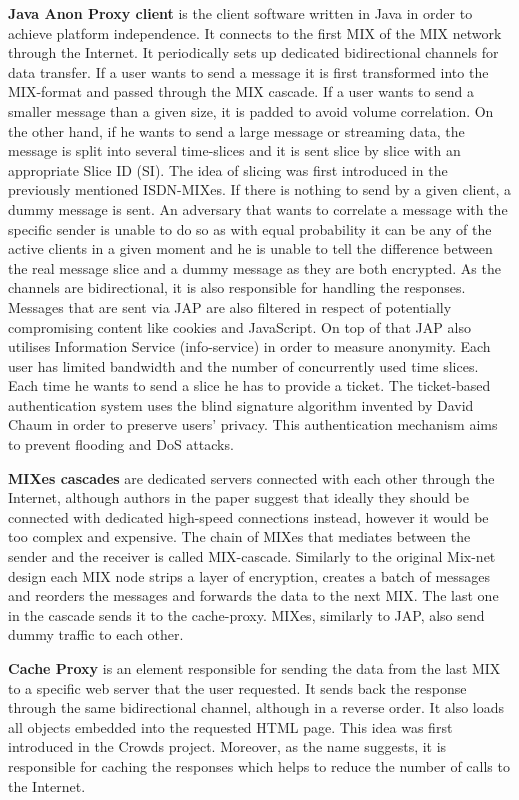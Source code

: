 \textbf{Java Anon Proxy client} is the client software written in Java in order to achieve platform independence. It connects to the first MIX of the MIX network through the Internet. It periodically sets up dedicated bidirectional channels for data transfer. If a user wants to send a message it is first transformed into the MIX-format and passed through the MIX cascade. If a user wants to send a smaller message than a given size, it is padded to avoid volume correlation. On the other hand, if he wants to send a large message or streaming data, the message is split into several time-slices and it is sent slice by slice with an appropriate Slice ID (SI). The idea of slicing was first introduced in the previously mentioned ISDN-MIXes. If there is nothing to send by a given client, a dummy message is sent. An adversary that wants to correlate a message with the specific sender is unable to do so as with equal probability it can be any of the active clients in a given moment and he is unable to tell the difference between the real message slice and a dummy message as they are both encrypted. As the channels are bidirectional, it is also responsible for handling the responses. Messages that are sent via JAP are also filtered in respect of potentially compromising content like cookies and JavaScript. On top of that JAP also utilises Information Service (info-service) in order to measure anonymity. Each user has limited bandwidth and the number of concurrently used time slices. Each time he wants to send a slice he has to provide a ticket. The ticket-based authentication system uses the blind signature algorithm invented by David Chaum \cite{blind-signatures} in order to preserve users' privacy. This authentication mechanism aims to prevent flooding and DoS attacks.

\textbf{MIXes cascades} are dedicated servers connected with each other through the Internet, although authors in the paper suggest that ideally they should be connected with dedicated high-speed connections instead, however it would be too complex and expensive. The chain of MIXes that mediates between the sender and the receiver is called MIX-cascade. Similarly to the original Mix-net design each MIX node strips a layer of encryption, creates a batch of messages and reorders the messages and forwards the data to the next MIX. The last one in the cascade sends it to the cache-proxy. MIXes, similarly to JAP, also send dummy traffic to each other.

\textbf{Cache Proxy} is an element responsible for sending the data from the last MIX to a specific web server that the user requested. It sends back the response through the same bidirectional channel, although in a reverse order. It also loads all objects embedded into the requested HTML page. This idea was first introduced in the Crowds project. Moreover, as the name suggests, it is responsible for caching the responses which helps to reduce the number of calls to the Internet.

